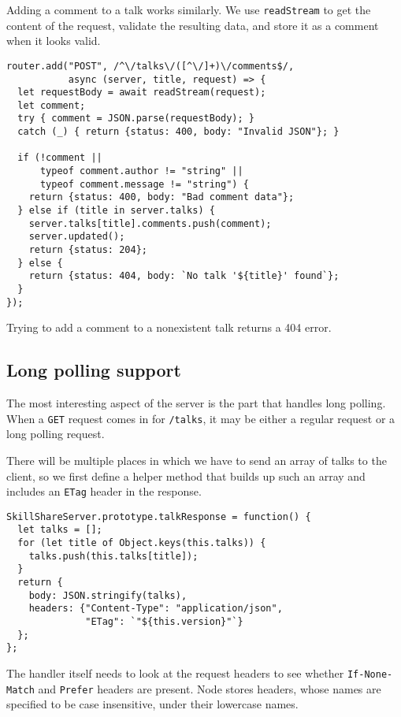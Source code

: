 Adding a comment to a talk works similarly. We use \lstinline`readStream` to get the content of the request, validate the resulting data, and store it as a comment when it looks valid.

\begin{lstlisting}
router.add("POST", /^\/talks\/([^\/]+)\/comments$/,
           async (server, title, request) => {
  let requestBody = await readStream(request);
  let comment;
  try { comment = JSON.parse(requestBody); }
  catch (_) { return {status: 400, body: "Invalid JSON"}; }

  if (!comment ||
      typeof comment.author != "string" ||
      typeof comment.message != "string") {
    return {status: 400, body: "Bad comment data"};
  } else if (title in server.talks) {
    server.talks[title].comments.push(comment);
    server.updated();
    return {status: 204};
  } else {
    return {status: 404, body: `No talk '${title}' found`};
  }
});
\end{lstlisting}
\noindent{}

Trying to add a comment to a nonexistent talk returns a 404 error.

\subsection{Long polling support}

The most interesting aspect of the server is the part that handles long polling. When a \lstinline`GET` request comes in for \lstinline`/talks`, it may be either a regular request or a long polling request.

There will be multiple places in which we have to send an array of talks to the client, so we first define a helper method that builds up such an array and includes an \lstinline`ETag` header in the response.

\begin{lstlisting}
SkillShareServer.prototype.talkResponse = function() {
  let talks = [];
  for (let title of Object.keys(this.talks)) {
    talks.push(this.talks[title]);
  }
  return {
    body: JSON.stringify(talks),
    headers: {"Content-Type": "application/json",
              "ETag": `"${this.version}"`}
  };
};
\end{lstlisting}
\noindent{}

The handler itself needs to look at the request headers to see whether \lstinline`If-None-Match` and \lstinline`Prefer` headers are present. Node stores headers, whose names are specified to be case insensitive, under their lowercase names.

